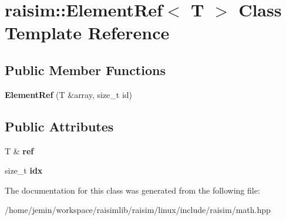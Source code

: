 \hypertarget{classraisim_1_1ElementRef}{}\section{raisim\+:\+:Element\+Ref$<$ T $>$ Class Template Reference}
\label{classraisim_1_1ElementRef}
\subsection*{Public Member Functions}
\begin{DoxyCompactItemize}
\item 
\mbox{\label{classraisim_1_1ElementRef_aa97d817e1fa838e803a174254ac9c703}} 
{\bfseries Element\+Ref} (T \&array, size\+\_\+t id)
\end{DoxyCompactItemize}
\subsection*{Public Attributes}
\begin{DoxyCompactItemize}
\item 
\mbox{\label{classraisim_1_1ElementRef_ac6dc1b647eaf99f702d5d117b1bbc0b2}} 
T \& {\bfseries ref}
\item 
\mbox{\label{classraisim_1_1ElementRef_afc299340f38f4adc9bdea6d4b8809202}} 
size\+\_\+t {\bfseries idx}
\end{DoxyCompactItemize}


The documentation for this class was generated from the following file\+:\begin{DoxyCompactItemize}
\item 
/home/jemin/workspace/raisimlib/raisim/linux/include/raisim/math.\+hpp\end{DoxyCompactItemize}
